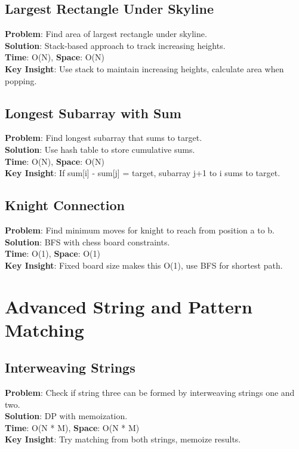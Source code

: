 \documentclass{report}
\begin{document}
\subsection{Largest Rectangle Under Skyline}
\textbf{Problem}: Find area of largest rectangle under skyline.\\
\textbf{Solution}: Stack-based approach to track increasing heights.\\
\textbf{Time}: O(N), \textbf{Space}: O(N)\\
\textbf{Key Insight}: Use stack to maintain increasing heights, calculate area when popping.

\subsection{Longest Subarray with Sum}
\textbf{Problem}: Find longest subarray that sums to target.\\
\textbf{Solution}: Use hash table to store cumulative sums.\\
\textbf{Time}: O(N), \textbf{Space}: O(N)\\
\textbf{Key Insight}: If sum[i] - sum[j] = target, subarray j+1 to i sums to target.

\subsection{Knight Connection}
\textbf{Problem}: Find minimum moves for knight to reach from position a to b.\\
\textbf{Solution}: BFS with chess board constraints.\\
\textbf{Time}: O(1), \textbf{Space}: O(1)\\
\textbf{Key Insight}: Fixed board size makes this O(1), use BFS for shortest path.

\section{Advanced String and Pattern Matching}

\subsection{Interweaving Strings}
\textbf{Problem}: Check if string three can be formed by interweaving strings one and two.\\
\textbf{Solution}: DP with memoization.\\
\textbf{Time}: O(N * M), \textbf{Space}: O(N * M)\\
\textbf{Key Insight}: Try matching from both strings, memoize results.
\end{document}
